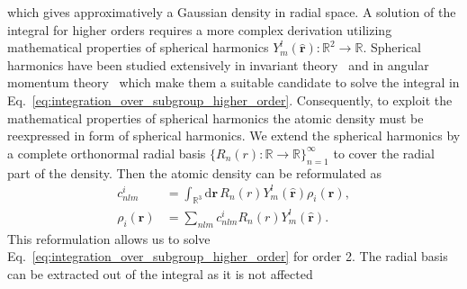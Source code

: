 which gives approximatively a Gaussian density in radial space.
A solution of the integral for higher orders requires a more complex derivation utilizing mathematical properties of spherical harmonics $Y_m^l(\hat{\mathbf{r}}):\mathbb{R}^2\rightarrow\mathbb{R}$. %
Spherical harmonics have been studied extensively in invariant theory~\cite{dowker2008spherical} and in angular momentum theory~\cite{yutsis1965theory} which make them a suitable candidate to solve the integral in Eq.~\eqref{eq:integration_over_subgroup_higher_order}.
Consequently, to exploit the mathematical properties of spherical harmonics the atomic density must be reexpressed in form of spherical harmonics.
We extend the spherical harmonics by a complete orthonormal radial basis $\{R_n(r) :\mathbb{R}\rightarrow\mathbb{R}\}_{n=1}^\infty$ to cover the radial part of the density.
Then the atomic density can be reformulated as
\begin{subequations}
\begin{align}
  c^i_{nlm} &= \int_{\mathbb{R}^3}\mathrm{d}\mathbf{r}\, R_n(r)Y^l_m(\hat{\mathbf{r}})\rho_i(\mathbf{r}), \\
  \rho_i(\mathbf{r}) &= \sum_{nlm} c^i_{nlm}R_n(r)Y^l_m(\hat{\mathbf{r}}).
  \label{eq:radial_angular_density}
\end{align}
\end{subequations}
This reformulation allows us to solve Eq.~\eqref{eq:integration_over_subgroup_higher_order} for order 2.
The radial basis can be extracted out of the integral as it is not affected 
